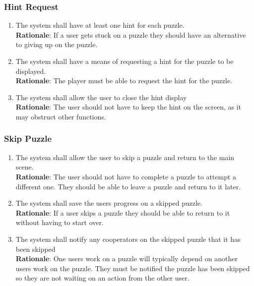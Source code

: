 \documentclass[12pt]{article}
\begin{document}
\subsubsection{Hint Request}
    \begin{enumerate}[label=HR\arabic*., series=HintRequest]
        \item The system shall have at least one hint for each puzzle.\\
        \textbf{Rationale}: If a user gets stuck on a puzzle they should have an alternative to giving up on the puzzle.
        \item The system shall have a means of requesting a hint for the puzzle to be displayed.\\
        \textbf{Rationale}: The player must be able to request the hint for the puzzle.
        \item The system shall allow the user to close the hint display\\
        \textbf{Rationale}: The user should not have to keep the hint on the screen, as it may obstruct other functions.
    \end{enumerate}
\subsubsection{Skip Puzzle}
    \begin{enumerate}[label=SP\arabic*., series=SkipPuzzle]
        \item The system shall allow the user to skip a puzzle and return to the main scene.\\
        \textbf{Rationale}: The user should not have to complete a puzzle to attempt a different one. They should be able to leave a puzzle and return to it later.
        \item The system shall save the users progress on a skipped puzzle.\\
        \textbf{Rationale}: If a user skips a puzzle they should be able to return to it without having to start over.
        \item The system shall notify any cooperators on the skipped puzzle that it has been skipped\\
        \textbf{Rationale}: One users work on a puzzle will typically depend on another users work on the puzzle. They must be notified the puzzle has been skipped so they are not waiting on an action from the other user.
    \end{enumerate}
\end{document}
